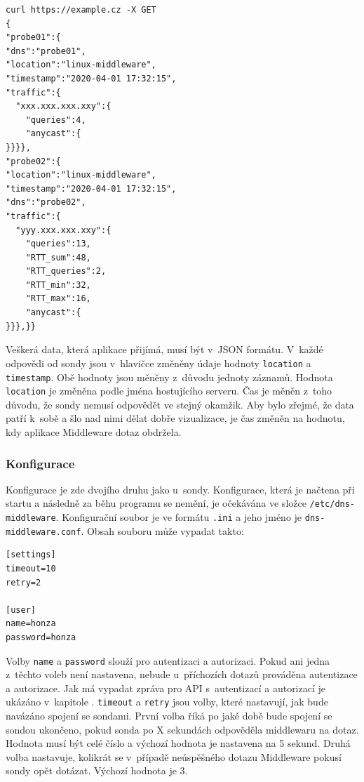 \documentclass[thesis=M,czech]{src/FITthesis}[2019/12/23]
\begin{document}
\begin{verbatim}
curl https://example.cz -X GET
{
"probe01":{
"dns":"probe01",
"location":"linux-middleware",
"timestamp":"2020-04-01 17:32:15",
"traffic":{
  "xxx.xxx.xxx.xxy":{
    "queries":4,
    "anycast":{
}}}},
"probe02":{
"location":"linux-middleware",
"timestamp":"2020-04-01 17:32:15",
"dns":"probe02",
"traffic":{
  "yyy.xxx.xxx.xxy":{
    "queries":13,
    "RTT_sum":48,
    "RTT_queries":2,
    "RTT_min":32,
    "RTT_max":16,
    "anycast":{      
}}},}}
\end{verbatim}

Veškerá data, která aplikace přijímá, musí být v~JSON formátu. V~každé odpovědi od sondy jsou v~hlavičce změněny údaje hodnoty \texttt{location} a \linebreak \texttt{timestamp}. Obě hodnoty jsou měněny z~důvodu jednoty záznamů. Hodnota \texttt{location} je změněna podle jména hostujícího serveru. Čas je měněn z~toho důvodu, že sondy nemusí odpovědět ve stejný okamžik. Aby bylo zřejmé, že data patří k~sobě a šlo nad nimi dělat dobře vizualizace, je čas změněn na hodnotu, kdy aplikace Middleware dotaz obdržela. 


\subsubsection{Konfigurace}
\label{sec:middleware-conf}
Konfigurace je zde dvojího druhu jako u~sondy. Konfigurace, která je načtena při startu a následně za běhu programu se nemění, je očekávána ve složce \texttt{/etc/dns-middleware}. Konfigurační soubor je ve formátu \texttt{.ini} a jeho jméno je \texttt{dns-middleware.conf}. Obsah souboru může vypadat takto: 
\begin{verbatim}
[settings]
timeout=10
retry=2

[user]
name=honza
password=honza
\end{verbatim}
Volby \texttt{name} a \texttt{password} slouží pro autentizaci a autorizaci. Pokud ani jedna z~těchto voleb není nastavena, nebude u~příchozích dotazů prováděna autentizace a autorizace. Jak má vypadat zpráva pro API s~autentizací a autorizací je ukázáno v~kapitole . \texttt{timeout} a \texttt{retry} jsou volby, které nastavují, jak bude navázáno spojení se sondami. První volba říká po jaké době bude spojení se sondou ukončeno, pokud sonda po X sekundách odpověděla middlewaru na dotaz. Hodnota musí být celé číslo a výchozí hodnota je nastavena na 5 sekund. Druhá volba nastavuje, kolikrát se v~případě neúspěšného dotazu Middleware pokusí sondy opět dotázat. Výchozí hodnota je 3. 
\end{document}

